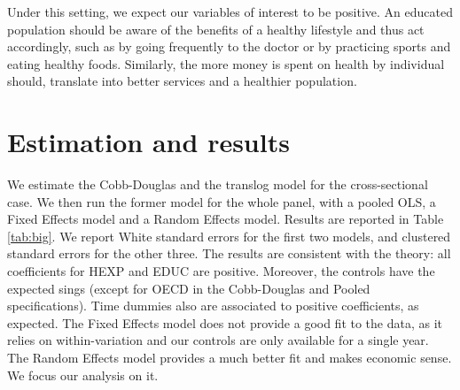 \documentclass[12pt,a4paper]{article}\usepackage[]{graphicx}\usepackage[]{color}
\begin{document}
Under this setting, we expect our variables of interest to be positive. An educated population should be aware of the benefits of a healthy lifestyle and thus act accordingly, such as by going frequently to the doctor or by practicing sports and eating healthy foods.  Similarly, the more money is spent on health by individual should, translate into better services and a healthier population.

\section{Estimation and results}





We estimate the Cobb-Douglas and the translog model for the cross-sectional case. We then run the former model for the whole panel, with a pooled OLS, a Fixed Effects model and a Random Effects model. Results are reported in Table \ref{tab:big}. We report White standard errors for the first two models, and clustered standard errors for the other three. The results are consistent with the theory: all coefficients for HEXP and EDUC are positive. Moreover, the controls have the expected sings (except for OECD in the Cobb-Douglas and Pooled specifications). Time dummies also are associated to positive coefficients, as expected. The Fixed Effects model does not provide a good fit to the data, as it relies on within-variation and our controls are only available for a single year. The Random Effects model provides a much better fit and makes economic sense. We focus our analysis on it.
\end{document}
